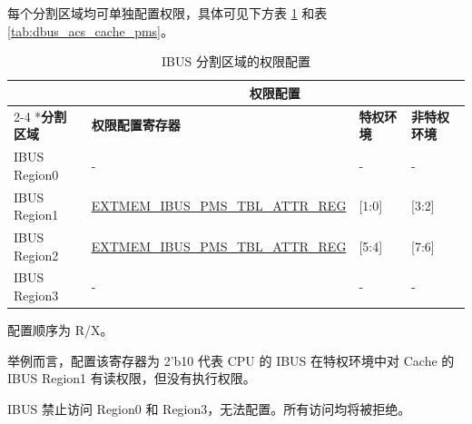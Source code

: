\documentclass[main\_\_CN.tex]{subfiles}
\begin{document}
每个分割区域均可单独配置权限，具体可见下方表 \ref{tab:ibus_acs_cache_pms} 和表 \ref{tab:dbus_acs_cache_pms}。

\begin{table}[H]
    \centering
    \caption{IBUS 分割区域的权限配置}
    \label{tab:ibus_acs_cache_pms}
    \begin{threeparttable}
    \begin{tabular}{ | l | l | l | l |}
    \hline
        \rowcolor{lightgray}
         & \multicolumn{3}{c|}{\textbf{权限配置}} \\\cline{2-4}
        \rowcolor{lightgray}
        \multirow{-2}*{\textbf{分割区域}} & \textbf{权限配置寄存器} & \textbf{特权环境} \tnote{A}& \textbf{非特权环境}\tnote{A}\\\hline
        IBUS Region0\tnote{C}  & - & - & -\\\hline
        IBUS Region1  & \hyperref[regdesc:EXTMEMIBUSPMSTBLATTRREG]{EXTMEM\_IBUS\_PMS\_TBL\_ATTR\_REG} & [1:0]\tnote{B} & [3:2]\\\hline
        IBUS Region2  & \hyperref[regdesc:EXTMEMIBUSPMSTBLATTRREG]{EXTMEM\_IBUS\_PMS\_TBL\_ATTR\_REG} & [5:4] & [7:6]\\\hline
        IBUS Region3\tnote{C}  & - & - & -\\\hline
    \end{tabular}
    \begin{tablenotes}
        \item[A] 配置顺序为 R/X。
        \item[B] 举例而言，配置该寄存器为 2'b10 代表 CPU 的 IBUS 在特权环境中对 Cache 的 IBUS Region1 有读权限，但没有执行权限。
        \item[C] IBUS 禁止访问 Region0 和 Region3，无法配置。所有访问均将被拒绝。
        \end{tablenotes}
    \end{threeparttable}
\end{table}
\end{document}
